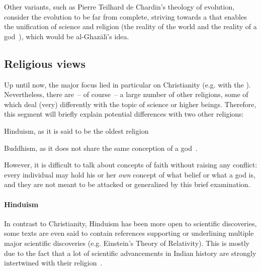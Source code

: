 Other variants, such as Pierre Teilhard de Chardin's theology of evolution, consider the evolution to be far from complete, striving towards a  that enables the unification of science and religion (the reality of the world and the reality of a god~\cite{teilhard1971christianity}), which would be al-Ghazālī's idea.


\subsection{Religious views}

\label{subsec:religious-views}Up until now, the major focus lied in particular on Christianity (e.g. with the ).
Nevertheless, there are~-- of course~-- a large number of other religions, some of which deal (very) differently with the topic of science or higher beings.
Therefore, this segment will briefly explain potential differences with two other religions: \begin{inlist}
    \item Hinduism, as it is said to be the oldest religion~\cite[p.~732]{Kurien2006}
    \item Buddhism, as it does not share the same conception of a god~\cite{roloff2011buddhismus}.
\end{inlist}

However, it is difficult to talk about concepts of faith without raising any conflict: every individual may hold his or her \emph{own} concept of what belief or what a god is, and they are not meant to be attacked or generalized by this brief examination.

\paragraph{Hinduism} In contrast to Christianity, Hinduism has been more open to scientific discoveries, some texts are even said to contain references supporting or underlining multiple major scientific discoveries (e.g. Einstein's Theory of Relativity).
This is mostly due to the fact that a lot of scientific advancements in Indian history are strongly intertwined with their religion~\cite{mitcham2005encyclopedia}.

